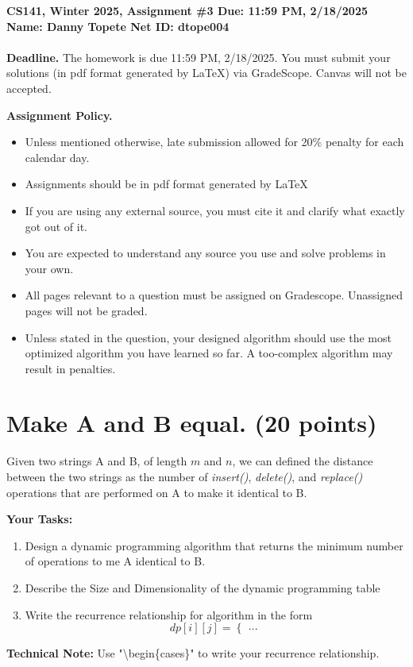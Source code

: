 \documentclass{article}[12pt]
\newcommand{\policy}[1]{#1}
\newcommand{\policy}[1]{}
\newcommand{\deadline}{11:59 PM, 2/18/2025}
\newcommand{\assigntitle}[1]{{
  \noindent \large \bf
  CS141, Winter 2025,
  Assignment \##1 \hfill Due: {\deadline}\\
  Name: Danny Topete  %
  \hspace{2.5in}
  Net ID: dtope004   %
  \\
  [-.05in]
  \mbox{}\hrulefill \mbox{}\\}}
\begin{document}
\assigntitle{3}{}
\policy{\textbf{Deadline.} The homework is due 11:59 PM, 2/18/2025. You must submit your solutions (in pdf
format generated by LaTeX) via GradeScope. Canvas will not be accepted.}\\
\date{}
\policy{\textbf{Assignment Policy.}
\begin{itemize}
    \item Unless mentioned otherwise, late submission allowed for 20\% penalty for each calendar day.
    \item Assignments should be in pdf format generated by LaTeX
    \item If you are using any external source, you must cite it and clarify what exactly got out of it.
    \item You are expected to understand any source you use and solve problems in your own.
    \item All pages relevant to a question must be assigned on Gradescope. Unassigned pages will not be graded.
    \item Unless stated in the question, your designed algorithm should use the most optimized algorithm you have learned so far. A too-complex algorithm may result in penalties.
\end{itemize}
}

\section{Make A and B equal. (20 points)}

Given two strings A and B, of length $m$ and $n$, we can defined the distance between the two strings as the number of \textit{insert()}, \textit{delete()}, and \textit{replace()} operations that are performed on A to make it identical to B. 

\noindent\textbf{Your Tasks:}
\begin{enumerate}
    \item Design a dynamic programming algorithm that returns the minimum number of operations to me A identical to B.
    \item Describe the Size and Dimensionality of the dynamic programming table
    \item Write the recurrence relationship for algorithm in the form
    \[
    dp[i][j] = \begin{cases}
        ...
    \end{cases}
    \]
\end{enumerate}
\noindent\textbf{Technical Note:} Use "\textbackslash begin\{cases\}" to write your recurrence relationship.
\end{document}
